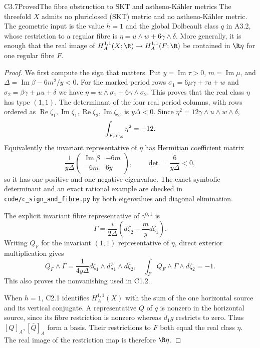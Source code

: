 \begin{claim}{C3.7}{Proved}{The fibre obstruction to SKT and astheno-K\"ahler metrics}
The threefold $X$ admits no pluriclosed (SKT) metric and no
astheno-K\"ahler metric.  The geometric input is the value $h=1$
and the global Dolbeault class $q$ in A3.2, whose restriction to a
regular fibre is $\eta=u\wedge w+6\gamma\wedge\delta$.
More generally, it is enough that the real image of
$H_A^{1,1}(X;\R)\to H_A^{1,1}(F;\R)$ be contained in
$\R\eta$ for one regular fibre $F$.
\end{claim}
\begin{proof}
We first compute the sign that matters.  Put
$y=\operatorname{Im}\tau>0$, $m=\operatorname{Im}\mu$, and
$\Delta=\operatorname{Im}\beta-6m^2/y<0$.
For the marked period rows
$\sigma_1=6\mu\gamma+\tau u+w$ and
$\sigma_2=\beta\gamma+\mu u+\delta$ we have
$\eta=u\wedge\sigma_1+6\gamma\wedge\sigma_2$.
This proves that the real class $\eta$ has type $(1,1)$.
The determinant of the four real period columns, with rows ordered
as $\operatorname{Re}\zeta_1,\operatorname{Im}\zeta_1,
\operatorname{Re}\zeta_2,\operatorname{Im}\zeta_2$, is
$y\Delta<0$.  Since $\eta^2=12\gamma\wedge u\wedge w\wedge\delta$,
\begin{equation}\label{eq:C-eta-negative}
\int_{F,\mathrm{or}_{\C}}\eta^2=-12.
\end{equation}
Equivalently the invariant representative of $\eta$ has Hermitian
coefficient matrix
\[
\frac1{y\Delta}
\begin{pmatrix}\operatorname{Im}\beta&-6m\\-6m&6y\end{pmatrix},
\qquad \det=\frac6{y\Delta}<0,
\]
so it has one positive and one negative eigenvalue.  The exact
symbolic determinant and an exact rational example are checked in
\texttt{code/c\_sign\_and\_fibre.py} by both eigenvalues and
diagonal elimination.

The explicit invariant fibre representative of $\gamma^{0,1}$ is
\[
\Gamma=\frac{i}{2\Delta}
\left(d\bar\zeta_2-\frac myd\bar\zeta_1\right).
\]
Writing $Q_F$ for the invariant $(1,1)$ representative of $\eta$,
direct exterior multiplication gives
\[
Q_F\wedge\Gamma=
\frac1{4y\Delta}
d\zeta_1\wedge d\bar\zeta_1\wedge d\bar\zeta_2,
\quad
\int_FQ_F\wedge\Gamma\wedge d\zeta_2=-1.
\]
This also proves the nonvanishing used in C1.2.

When $h=1$, C2.1 identifies $H_A^{1,1}(X)$ with the sum of the
one horizontal source and its vertical conjugate.  A representative
$Q$ of $q$ is nonzero in the horizontal source, since its fibre
restriction is nonzero whereas $d_1g$ restricts to zero.  Thus
$[Q]_A,[\bar Q]_A$ form a basis.  Their restrictions to $F$ both
equal the real class $\eta$.  The real image of the restriction map
is therefore $\R\eta$.


\end{proof}
